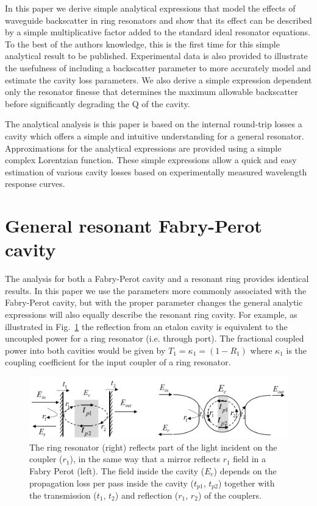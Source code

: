 \documentclass[10pt]{article}
\begin{document}
In this paper we derive simple analytical expressions that model the effects of waveguide  backscatter in ring resonators and show that its effect can be described by a simple multiplicative factor added to the standard ideal resonator equations. To the best of the authors knowledge, this is the first time for this simple analytical result to be published. Experimental data is also provided to illustrate the usefulness of including a backscatter parameter to more accurately model and estimate the cavity loss parameters.  We also derive a simple expression dependent only the resonator finesse that determines the maximum allowable backscatter before significantly degrading the Q of the cavity.   

The analytical analysis is this paper is based on the internal round-trip losses a cavity which offers a simple and intuitive understanding for a general resonator. Approximations for the analytical expressions are provided using a simple complex Lorentzian function.  These simple expressions allow a quick and easy estimation of various cavity losses based on experimentally measured wavelength response curves.  



\section{General resonant Fabry-Perot cavity}
The analysis for both a Fabry-Perot cavity and a resonant ring provides identical results.
In this paper we use the parameters more commonly associated with the Fabry-Perot cavity, but with the proper parameter changes the general analytic expressions will also equally describe the resonant ring cavity.
For example, as illustrated in Fig.~\ref{fig:resonator}  the reflection from an etalon cavity is equivalent to the uncoupled power for a ring resonator (i.e. through port).
The fractional coupled power into both cavities would be given by $T_1 = \kappa_1=(1-R_1)$  where $\kappa_1$ is the coupling coefficient for the input coupler of a ring resonator.


\begin{figure}[htbp]
\centering\includegraphics[width=1.0\textwidth]{figures/resonator_v4}
\caption{The ring resonator (right) reflects part of the light incident on the coupler ($r_1$), in the same way that a  mirror reflects $r_1$ field in a Fabry Perot (left). The field inside the cavity ($E_c$) depends on the propagation loss per pass inside the cavity  ($t_{p1}$, $t_{p2}$)  together with
the transmission ($t_1$, $t_2$) and reflection ($r_1$, $r_2$) of the couplers.}
\label{fig:resonator}
\end{figure}
\end{document}
